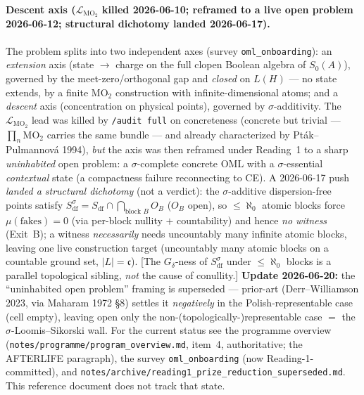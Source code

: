 \paragraph{Descent axis ($\mathcal L_{\mathrm{MO}_2}$ killed 2026-06-10; reframed
to a live open problem 2026-06-12; structural dichotomy landed 2026-06-17).}
The problem splits into two independent axes (survey
\texttt{oml\_onboarding}): an \emph{extension} axis (state
$\to$ charge on the full clopen Boolean algebra of $S_0(A)$),
governed by the meet-zero/orthogonal gap and \emph{closed} on
$L(H)$ --- no state extends, by a finite $\mathrm{MO}_2$
construction with infinite-dimensional atoms; and a \emph{descent}
axis (concentration on physical points), governed by
$\sigma$-additivity. The $\mathcal L_{\mathrm{MO}_2}$ lead was killed by
\texttt{/audit full} on concreteness (concrete but trivial ---
$\prod_n \mathrm{MO}_2$ carries the same bundle --- and already characterized by
Pt\'ak--Pulmannov\'a 1994), \emph{but} the axis was then reframed under Reading~1
to a sharp \emph{uninhabited} open problem: a $\sigma$-complete concrete OML with a
$\sigma$-essential \emph{contextual} state (a compactness failure reconnecting to
CE). A 2026-06-17 push \emph{landed a structural dichotomy} (not a verdict): the
$\sigma$-additive dispersion-free points satisfy
$S_{\mathrm{df}}^\sigma = S_{\mathrm{df}} \cap \bigcap_{\text{block }B} O_B$
($O_B$ open), so $\le\aleph_0$ atomic blocks force $\mu(\text{fakes})=0$ (via
per-block nullity $+$ countability) and hence \emph{no witness} (Exit~B); a witness
\emph{necessarily} needs uncountably many infinite atomic blocks, leaving one live
construction target (uncountably many atomic blocks on a countable ground set,
$|L|=\mathfrak c$). [The $G_\delta$-ness of $S_{\mathrm{df}}^\sigma$ under $\le\aleph_0$
blocks is a parallel topological sibling, \emph{not} the cause of conullity.]
\textbf{Update 2026-06-20:} the ``uninhabited open problem'' framing is superseded ---
prior-art (Derr--Williamson 2023, via Maharam 1972 \S8) settles it \emph{negatively}
in the Polish-representable case (cell empty), leaving open only the
non-(topologically-)representable case $=$ the $\sigma$-Loomis--Sikorski wall. For
the current status see the programme overview
(\texttt{notes/programme/program\_overview.md}, item~4, authoritative; the AFTERLIFE
paragraph), the survey \texttt{oml\_onboarding} (now Reading-1-committed), and
\texttt{notes/archive/reading1\_prize\_reduction\_superseded.md}.
This reference document does not track that state.


